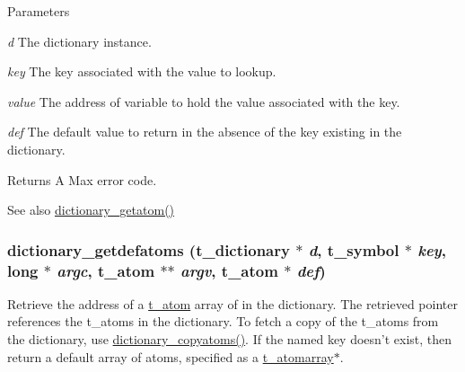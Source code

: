 \begin{DoxyParams}{Parameters}
\item[{\em d}]The dictionary instance. \item[{\em key}]The key associated with the value to lookup. \item[{\em value}]The address of variable to hold the value associated with the key. \item[{\em def}]The default value to return in the absence of the key existing in the dictionary. \end{DoxyParams}
\begin{DoxyReturn}{Returns}
A Max error code.
\end{DoxyReturn}
\begin{DoxySeeAlso}{See also}
\hyperlink{group__dictionary_ga28a8378a4710e667a63f8947261bd439}{dictionary\_\-getatom()} 
\end{DoxySeeAlso}
\hypertarget{group__dictionary_ga2ab733c5d5fe85e31e73d5a66d75dabd}{
\subsubsection[{dictionary\_\-getdefatoms}]{ dictionary\_\-getdefatoms ({\bf t\_\-dictionary} $\ast$ {\em d}, \/  {\bf t\_\-symbol} $\ast$ {\em key}, \/  long $\ast$ {\em argc}, \/  {\bf t\_\-atom} $\ast$$\ast$ {\em argv}, \/  {\bf t\_\-atom} $\ast$ {\em def})}}
\label{group__dictionary_ga2ab733c5d5fe85e31e73d5a66d75dabd}


Retrieve the address of a \hyperlink{structt__atom}{t\_\-atom} array of in the dictionary. The retrieved pointer references the t\_\-atoms in the dictionary. To fetch a copy of the t\_\-atoms from the dictionary, use \hyperlink{group__dictionary_ga15aff654a0d97b363e7676ff7e9709fd}{dictionary\_\-copyatoms()}. If the named key doesn't exist, then return a default array of atoms, specified as a \hyperlink{structt__atomarray}{t\_\-atomarray}$\ast$.


